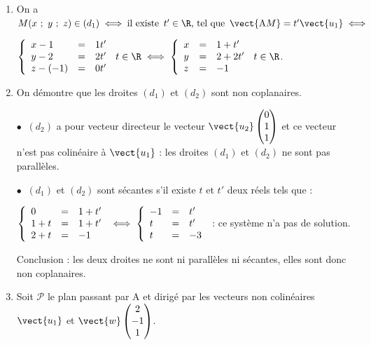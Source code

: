 \begin{enumerate}
\item 

On a $M(x~;~y~;~z) \in (d_1) \iff \text{il existe }\, t' \in \R, \, \text{tel que } \, \vect{\text{A}M} = t'\vect{u_1} \iff $

$\left\{\begin{array}{l c l}
x- 1&=&1t'\\
y - 2&=&2t'\\
z-(-1)&=&0t'
\end{array}\right.\, t \in \R \iff \left\{\begin{array}{l c l}
x &=&1 + t'\\
y &=&2 + 2t'\\
z&=&- 1
\end{array}\right.\, t \in \R $.

\item On démontre que les droites $(d_1)$ et $(d_2)$ sont non coplanaires.

$\bullet~$ $(d_2)$ a pour vecteur directeur le vecteur $\vect{u_2}\begin{pmatrix}0\\1\\1\end{pmatrix}$ et ce vecteur n'est pas colinéaire à $\vect{u_1}$ : les droites $(d_1)$ et $(d_2)$ ne sont pas parallèles.

$\bullet~$ $(d_1)$ et $(d_2)$ sont sécantes s'il existe $t$ et $t'$ deux réels tels que :

$\left\{\begin{array}{l c l}
0&=&1 + t'\\
1 + t&=&1 + t'\\
2 + t &=&-1 \\
\end{array}\right.\iff \left\{\begin{array}{l c l}
-1&=& t'\\
t & =&t'\\
t &=&-3 \\
\end{array}\right.$ : ce système n'a pas de solution.

Conclusion : les deux droites ne sont ni parallèles ni sécantes, elles sont donc non coplanaires.
\item Soit $\mathcal{P}$ le plan passant par A et dirigé par les vecteurs non colinéaires $\vect{u_1}$ et $\vect{w}\begin{pmatrix}2\\-1\\1\\\end{pmatrix}$.


\end{enumerate}
